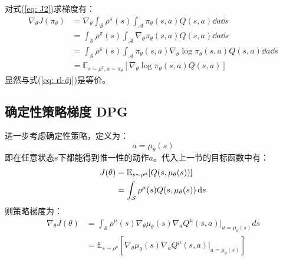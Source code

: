 对式(\ref{eq: J2})求梯度有：
\begin{align*}{}
    \nabla_\theta J(\pi_\theta) &= \nabla_\theta \int_{\mathcal{S}}\rho^\pi(s)\int_{\mathcal{A}}\pi_\theta(s,a)Q(s,a)\dd a \dd s \\
    &= \int_{\mathcal{S}}\rho^\pi(s) \int_{\mathcal{A}} \nabla_\theta \pi_\theta(s,a)Q(s,a)\dd a \dd s \\
    &= \int_{\mathcal{S}}\rho^\pi(s) \int_{\mathcal{A}} \pi_\theta(s,a) \nabla_\theta \log \pi_\theta(s,a)Q(s,a)\dd a \dd s \\
    &= \mathbb{E}_{s\sim\rho^\pi,a\sim\pi_\theta}[\nabla_\theta \log \pi_\theta(s,a)Q(s,a)]
\end{align*}
显然与式(\ref{eq: rl-dj})是等价。

\subsection{确定性策略梯度 DPG}
进一步考虑确定性策略，定义为：
\begin{equation*}
    a = \mu_\theta(s)
\end{equation*}
即在任意状态$s$下都能得到惟一性的动作$a$。代入上一节的目标函数中有：
\begin{align}{\label{eq: J2}}
    J(\theta) &= \mathbb{E}_{s\sim\rho^\mu}[Q(s,\mu_\theta(s))] \notag \\ 
    &= \int_{\mathcal{S}}\rho^\mu(s)Q(s,\mu_\theta(s))\mathop{}\!\mathrm{d} s
\end{align}
则策略梯度为：
\begin{align*}
\nabla_\theta J(\theta) &= \int_{\mathcal{S}} \rho^\mu(s) \nabla_\theta \mu_\theta(s) \nabla_a Q^\mu(s,a)|_{a=\mu_\theta(s)} ds \\
&= \mathbb{E}_{s\sim\rho^\mu}\left[ \nabla_\theta \mu_\theta(s) \nabla_a Q^\mu(s,a)|_{a=\mu_\theta(s)} \right]
\end{align*}







